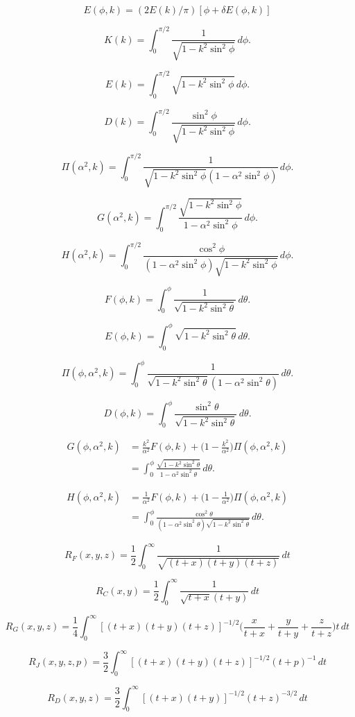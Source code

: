 \documentclass{article}
\begin{document}
\[ E(\phi, k) = (2 E(k) / \pi) [ \phi + \delta E(\phi, k) ] \]
\pagebreak

\[ K(k) = \int_0^{\pi/2} \frac1{\sqrt{1-k^2\sin^2\phi}}\,d\phi. \]
\pagebreak

\[ E(k) = \int_0^{\pi/2} \sqrt{1-k^2\sin^2\phi}\,d\phi. \]
\pagebreak

\[ D(k) = \int_0^{\pi/2} \frac{\sin^2\phi}{\sqrt{1-k^2\sin^2\phi}}\,d\phi. \]
\pagebreak

\[ \Pi(\alpha^2, k) = \int_0^{\pi/2} \frac1{\sqrt{1-k^2\sin^2\phi}(1 - \alpha^2\sin^2\phi)}\,d\phi. \]
\pagebreak

\[ G(\alpha^2, k) = \int_0^{\pi/2} \frac{\sqrt{1-k^2\sin^2\phi}}{1 - \alpha^2\sin^2\phi}\,d\phi. \]
\pagebreak

\[ H(\alpha^2, k) = \int_0^{\pi/2} \frac{\cos^2\phi}{(1-\alpha^2\sin^2\phi)\sqrt{1-k^2\sin^2\phi}} \,d\phi. \]
\pagebreak

\[ F(\phi, k) = \int_0^\phi \frac1{\sqrt{1-k^2\sin^2\theta}}\,d\theta. \]
\pagebreak

\[ E(\phi, k) = \int_0^\phi \sqrt{1-k^2\sin^2\theta}\,d\theta. \]
\pagebreak

\[ \Pi(\phi, \alpha^2, k) = \int_0^\phi \frac1{\sqrt{1-k^2\sin^2\theta}(1 - \alpha^2\sin^2\theta)}\,d\theta. \]
\pagebreak

\[ D(\phi, k) = \int_0^\phi \frac{\sin^2\theta}{\sqrt{1-k^2\sin^2\theta}}\,d\theta. \]
\pagebreak

\[ \begin{align} G(\phi, \alpha^2, k) &= \frac{k^2}{\alpha^2} F(\phi, k) + \biggl(1 - \frac{k^2}{\alpha^2}\biggr) \Pi(\phi, \alpha^2, k) \\ &= \int_0^\phi \frac{\sqrt{1-k^2\sin^2\theta}}{1 - \alpha^2\sin^2\theta}\,d\theta. \end{align} \]
\pagebreak

\[ \begin{align} H(\phi, \alpha^2, k) &= \frac1{\alpha^2} F(\phi, k) + \biggl(1 - \frac1{\alpha^2}\biggr) \Pi(\phi, \alpha^2, k) \\ &= \int_0^\phi \frac{\cos^2\theta} {(1-\alpha^2\sin^2\theta)\sqrt{1-k^2\sin^2\theta}} \,d\theta. \end{align} \]
\pagebreak

\[ R_F(x, y, z) = \frac12 \int_0^\infty\frac1{\sqrt{(t + x) (t + y) (t + z)}}\, dt \]
\pagebreak

\[ R_C(x, y) = \frac12 \int_0^\infty\frac1{\sqrt{t + x}(t + y)}\,dt \]
\pagebreak

\[ R_G(x, y, z) = \frac14 \int_0^\infty[(t + x) (t + y) (t + z)]^{-1/2} \biggl( \frac x{t + x} + \frac y{t + y} + \frac z{t + z} \biggr)t\,dt \]
\pagebreak

\[ R_J(x, y, z, p) = \frac32 \int_0^\infty [(t + x) (t + y) (t + z)]^{-1/2} (t + p)^{-1}\, dt \]
\pagebreak

\[ R_D(x, y, z) = \frac32 \int_0^\infty[(t + x) (t + y)]^{-1/2} (t + z)^{-3/2}\, dt \]
\pagebreak
\end{document}

